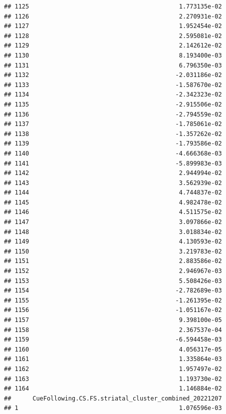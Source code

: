 \documentclass[
]{article}
\begin{document}
\begin{verbatim}
## 1125                                          1.773135e-02
## 1126                                          2.270931e-02
## 1127                                          1.952454e-02
## 1128                                          2.595081e-02
## 1129                                          2.142612e-02
## 1130                                          8.193400e-03
## 1131                                          6.796350e-03
## 1132                                         -2.031186e-02
## 1133                                         -1.587670e-02
## 1134                                         -2.342323e-02
## 1135                                         -2.915506e-02
## 1136                                         -2.794559e-02
## 1137                                         -1.785061e-02
## 1138                                         -1.357262e-02
## 1139                                         -1.793586e-02
## 1140                                         -4.666368e-03
## 1141                                         -5.899983e-03
## 1142                                          2.944994e-02
## 1143                                          3.562939e-02
## 1144                                          4.744837e-02
## 1145                                          4.982478e-02
## 1146                                          4.511575e-02
## 1147                                          3.097866e-02
## 1148                                          3.018834e-02
## 1149                                          4.130593e-02
## 1150                                          3.219783e-02
## 1151                                          2.883586e-02
## 1152                                          2.946967e-03
## 1153                                          5.508426e-03
## 1154                                         -2.782689e-03
## 1155                                         -1.261395e-02
## 1156                                         -1.051167e-02
## 1157                                          9.398100e-05
## 1158                                          2.367537e-04
## 1159                                         -6.594458e-03
## 1160                                          4.056317e-05
## 1161                                          1.335864e-03
## 1162                                          1.957497e-02
## 1163                                          1.193730e-02
## 1164                                          1.146884e-02
##      CueFollowing.CS.FS.striatal_cluster_combined_20221207
## 1                                             1.076596e-03

\end{verbatim}
\end{document}

